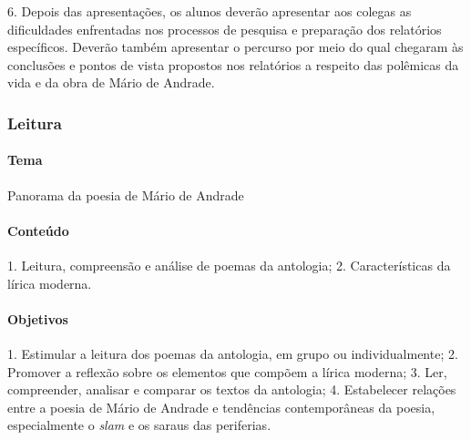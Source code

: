 \documentclass[11pt]{extarticle}
\begin{document}
6. Depois das apresentações, os alunos deverão apresentar aos colegas as
dificuldades enfrentadas nos processos de pesquisa e preparação dos
relatórios específicos. Deverão também apresentar o percurso por meio do
qual chegaram às conclusões e pontos de vista propostos nos relatórios a
respeito das polêmicas da vida e da obra de Mário de Andrade.


\subsubsection{Leitura}





\paragraph{Tema} Panorama da poesia de Mário de Andrade

\paragraph{Conteúdo} 1. Leitura, compreensão e análise de poemas da
antologia; 2. Características da lírica moderna.

\paragraph{Objetivos} 1. Estimular a leitura dos poemas da antologia, em
grupo ou individualmente; 2. Promover a reflexão sobre os elementos que
compõem a lírica moderna; 3. Ler, compreender, analisar e comparar os
textos da antologia; 4. Estabelecer relações entre a poesia de Mário de
Andrade e tendências contemporâneas da poesia, especialmente o
\emph{slam} e os saraus das periferias.
\end{document}
